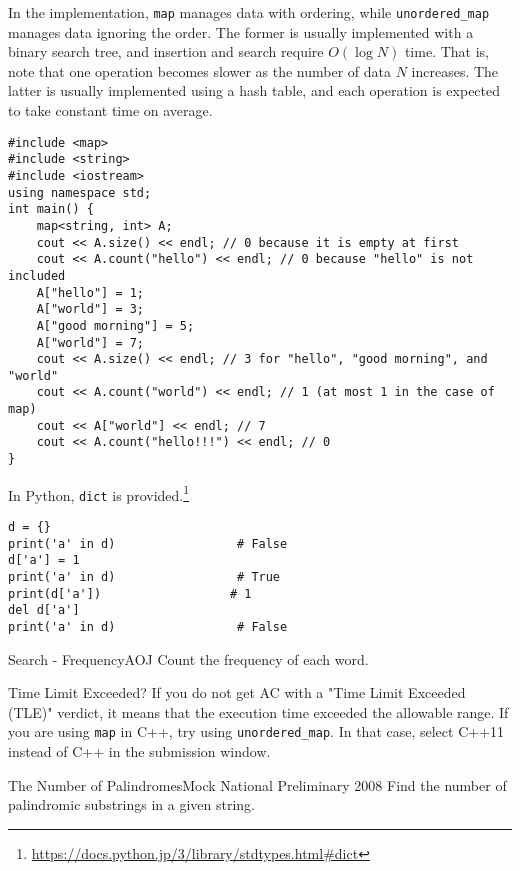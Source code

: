 In the implementation, \texttt{map} manages data with ordering, while \texttt{unordered\_map} manages data ignoring the order. The former is usually implemented with a binary search tree, and insertion and search require $O(\log N)$ time. That is, note that one operation becomes slower as the number of data $N$ increases. The latter is usually implemented using a hash table, and each operation is expected to take constant time on average.

\begin{cbox}[emph={map}]
\begin{verbatim}
#include <map>
#include <string>
#include <iostream>
using namespace std;
int main() {
    map<string, int> A;
    cout << A.size() << endl; // 0 because it is empty at first
    cout << A.count("hello") << endl; // 0 because "hello" is not included
    A["hello"] = 1;
    A["world"] = 3;
    A["good morning"] = 5;
    A["world"] = 7;
    cout << A.size() << endl; // 3 for "hello", "good morning", and "world"
    cout << A.count("world") << endl; // 1 (at most 1 in the case of map)
    cout << A["world"] << endl; // 7
    cout << A.count("hello!!!") << endl; // 0
}
\end{verbatim}
\end{cbox}

In Python, \texttt{dict} is provided.\footnote{\url{https://docs.python.jp/3/library/stdtypes.html\#dict}}
\begin{pybox}
\begin{verbatim}
d = {}
print('a' in d)                 # False
d['a'] = 1
print('a' in d)                 # True
print(d['a'])                  # 1
del d['a']
print('a' in d)                 # False
\end{verbatim}
\end{pybox}

\begin{psbox}{Search - Frequency}{AOJ}
Count the frequency of each word.

\end{psbox}

\begin{tipsbox}{Time Limit Exceeded?}
If you do not get AC with a "Time Limit Exceeded (TLE)" verdict, it means that the execution time exceeded the allowable range.
If you are using \texttt{map} in C++, try using \texttt{unordered\_map}. In that case, select C++11 instead of C++ in the submission window.
\end{tipsbox}

\begin{pbox}{The Number of Palindromes}{Mock National Preliminary 2008}
Find the number of palindromic substrings in a given string.

\end{pbox}

